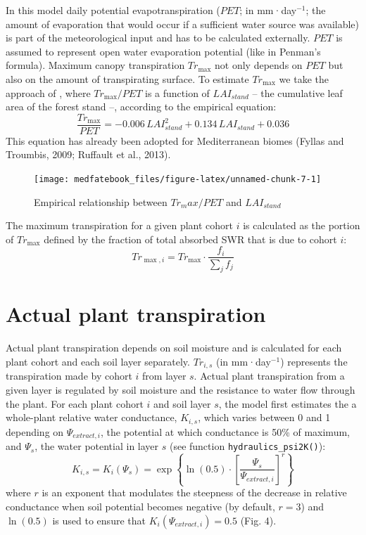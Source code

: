 \documentclass[]{book}
\begin{document}
In this model daily potential evapotranspiration (\(PET\); in mm·day\(^{-1}\); the amount of evaporation that would occur if a sufficient water source was available) is part of the meteorological input and has to be calculated externally. \(PET\) is assumed to represent open water evaporation potential (like in Penman's formula). Maximum canopy transpiration \(Tr_{\max}\) not only depends on \(PET\) but also on the amount of transpirating surface. To estimate \(Tr_{\max}\) we take the approach of \citet{Granier1999}, where \(Tr_{\max}/PET\) is a function of \(LAI_{stand}\) -- the cumulative leaf area of the forest stand --, according to the empirical equation:
\begin{equation}
\frac{Tr_{\max}}{PET}= -0.006\,LAI_{stand}^2+0.134\,LAI_{stand}+0.036
\end{equation}
This equation has already been adopted for Mediterranean biomes (Fyllas and
Troumbis, 2009; Ruffault et al., 2013).

\begin{figure}

{\centering \texttt{[image: medfatebook\_files/figure-latex/unnamed-chunk-7-1]} 

}

\caption{Empirical relationship between $Tr_max/PET$ and $LAI_{stand}$}\label{fig:unnamed-chunk-7}
\end{figure}

The maximum transpiration for a given plant cohort \(i\) is calculated as the
portion of \(Tr_{\max}\) defined by the fraction of total absorbed SWR that is due
to cohort \(i\):
\begin{equation}
Tr_{\max, i} = Tr_{\max} \cdot \frac{f_i}{\sum_{j}{f_j}}
\end{equation}

\hypertarget{actual-plant-transpiration}{%
\section{Actual plant transpiration}\label{actual-plant-transpiration}}

Actual plant transpiration depends on soil moisture and is calculated for each plant cohort and each soil layer separately. \(Tr_{i,s}\) (in mm·day\(^{-1}\)) represents the transpiration made by cohort \(i\) from layer \(s\). Actual plant transpiration from a given layer is regulated by soil moisture and the resistance to water flow through the plant. For each plant cohort \(i\) and soil layer \(s\), the model first estimates the a whole-plant relative water conductance, \(K_{i,s}\), which varies between 0 and 1 depending on \(\Psi_{extract,i}\), the potential at which conductance is 50\% of maximum, and \(\Psi_s\), the water potential in layer \(s\) (see function \texttt{hydraulics\_psi2K()}):
\begin{equation}
K_{i,s}=K_{i}(\Psi_s) = \exp \left \{\ln{(0.5)}\cdot \left[ \frac{\Psi_s}{\Psi_{extract,i}} \right] ^r \right \} 
\end{equation}
where \(r\) is an exponent that modulates the steepness of the decrease in relative
conductance when soil potential becomes negative (by default, \(r = 3\)) and \(\ln(0.5)\)
is used to ensure that \(K_{i}(\Psi_{extract,i}) = 0.5\) (Fig. 4).
\end{document}
